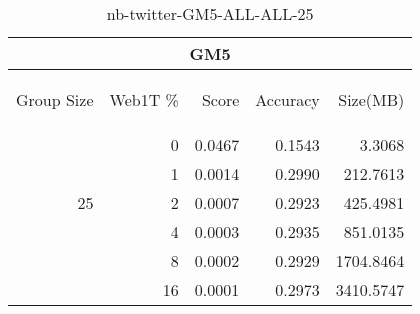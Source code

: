 \begin{center}
\begin{table}[htbp]
\begin{tabular}{ | r | r | r | r | r |}
\hline
\multicolumn{5}{|c|}{GM5}\\
\hline
\begin{sideways}Group Size\end{sideways} & \begin{sideways}Web1T \%\end{sideways} & \begin{sideways}Score\end{sideways} & \begin{sideways}Accuracy\end{sideways} & \begin{sideways}Size(MB)\end{sideways}\\
\hline
\multirow{5}{*}{25}
 & 0 & 0.0467 & 0.1543 & 3.3068\\ \cline{2-5}
 & 1 & 0.0014 & 0.2990 & 212.7613\\ \cline{2-5}
 & 2 & 0.0007 & 0.2923 & 425.4981\\ \cline{2-5}
 & 4 & 0.0003 & 0.2935 & 851.0135\\ \cline{2-5}
 & 8 & 0.0002 & 0.2929 & 1704.8464\\ \cline{2-5}
 & 16 & 0.0001 & 0.2973 & 3410.5747\\ \cline{2-5}
\hline
\end{tabular}
\caption{nb-twitter-GM5-ALL-ALL-25}
\label{table:nb-twitter-GM5-ALL-ALL-25}
\end{table}
\end{center}

